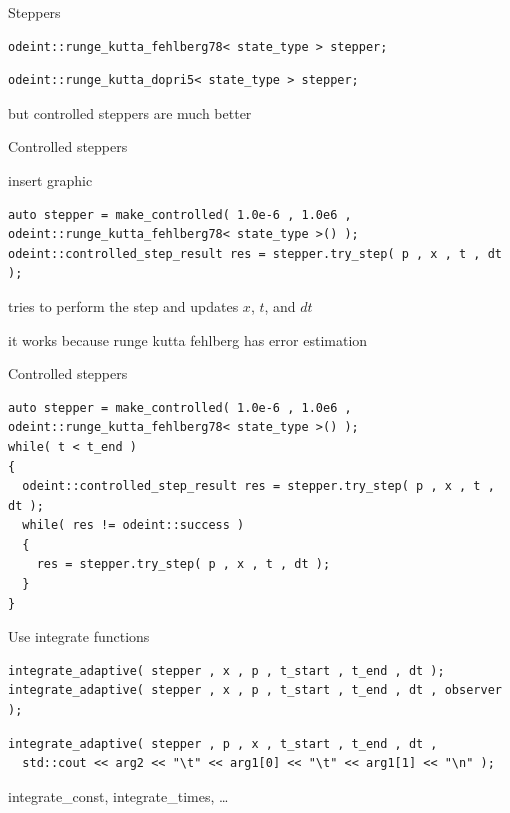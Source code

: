 \begin{frame}[fragile]

  Steppers
  \begin{lstlisting}
odeint::runge_kutta_fehlberg78< state_type > stepper;
  \end{lstlisting}

  \begin{lstlisting}
odeint::runge_kutta_dopri5< state_type > stepper;
  \end{lstlisting}

  but controlled steppers are much better

\end{frame}


\begin{frame}[fragile]
 Controlled steppers

 insert graphic

 \begin{lstlisting}
auto stepper = make_controlled( 1.0e-6 , 1.0e6 ,  odeint::runge_kutta_fehlberg78< state_type >() );
odeint::controlled_step_result res = stepper.try_step( p , x , t , dt );
 \end{lstlisting}

 tries to perform the step and updates $x$, $t$, and $dt$

 it works because runge kutta fehlberg has error estimation

\end{frame}


\begin{frame}[fragile]

Controlled steppers

\begin{lstlisting}
auto stepper = make_controlled( 1.0e-6 , 1.0e6 ,  odeint::runge_kutta_fehlberg78< state_type >() );
while( t < t_end )
{
  odeint::controlled_step_result res = stepper.try_step( p , x , t , dt );
  while( res != odeint::success )
  {
    res = stepper.try_step( p , x , t , dt );
  }
}
\end{lstlisting}

Use integrate functions

\begin{lstlisting}
integrate_adaptive( stepper , x , p , t_start , t_end , dt ); 
integrate_adaptive( stepper , x , p , t_start , t_end , dt , observer );
\end{lstlisting}

\begin{lstlisting}
integrate_adaptive( stepper , p , x , t_start , t_end , dt ,
  std::cout << arg2 << "\t" << arg1[0] << "\t" << arg1[1] << "\n" );
\end{lstlisting}

integrate\_const, integrate\_times, \dots

\end{frame}



